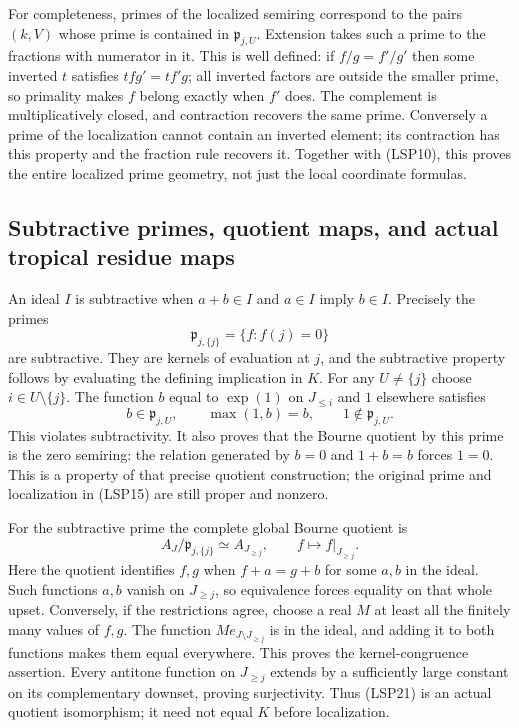 For completeness, primes of the localized semiring correspond to
the pairs $(k,V)$ whose prime is contained in $\mathfrak p_{j,U}$.
Extension takes such a prime to the fractions with numerator in it.
This is well defined: if $f/g=f'/g'$ then some inverted $t$ satisfies
$tfg'=tf'g$; all inverted factors are outside the smaller prime,
so primality makes $f$ belong exactly when $f'$ does. The complement
is multiplicatively closed, and contraction recovers the same prime.
Conversely a prime of the localization cannot contain an inverted
element; its contraction has this property and the fraction rule
recovers it. Together with (LSP10), this proves the entire localized
prime geometry, not just the local coordinate formulas.

\subsection{Subtractive primes, quotient maps, and actual tropical residue maps}

An ideal $I$ is subtractive when $a+b\in I$ and $a\in I$ imply
$b\in I$. Precisely the primes
\begin{equation}\tag{LSP19}
 \mathfrak p_{j,\{j\}}=\{f:f(j)=0\}
\end{equation}
are subtractive. They are kernels of evaluation at $j$, and the
subtractive property follows by evaluating the defining implication
in $K$. For any $U\ne\{j\}$ choose $i\in U\setminus\{j\}$.
The function $b$ equal to $\exp(1)$ on $J_{\le i}$ and $1$
elsewhere satisfies
\begin{equation}\tag{LSP20}
 b\in\mathfrak p_{j,U},\qquad \max(1,b)=b,
 \qquad 1\notin\mathfrak p_{j,U}.
\end{equation}
This violates subtractivity. It also proves that the Bourne quotient
by this prime is the zero semiring: the relation generated by
$b=0$ and $1+b=b$ forces $1=0$. This is a property of that precise
quotient construction; the original prime and localization in
(LSP15) are still proper and nonzero.

For the subtractive prime the complete global Bourne quotient is
\begin{equation}\tag{LSP21}
 A_J/\mathfrak p_{j,\{j\}}\simeq A_{J_{\ge j}},
 \qquad f\longmapsto f|_{J_{\ge j}}.
\end{equation}
Here the quotient identifies $f,g$ when $f+a=g+b$ for some
$a,b$ in the ideal. Such functions $a,b$ vanish on $J_{\ge j}$,
so equivalence forces equality on that whole upset. Conversely,
if the restrictions agree, choose a real $M$ at least all the
finitely many values of $f,g$. The function $M e_{J\setminus
J_{\ge j}}$ is in the ideal, and adding it to both functions
makes them equal everywhere. This proves the kernel-congruence
assertion. Every antitone function on $J_{\ge j}$ extends by a
sufficiently large constant on its complementary downset, proving
surjectivity. Thus (LSP21) is an actual quotient isomorphism; it
need not equal $K$ before localization.

